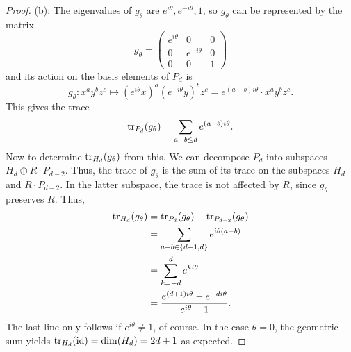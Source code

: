 \documentclass{amsart}
\begin{document}
\begin{proof}
		(b): The eigenvalues of $g_{\theta}$ are $e^{i\theta},e^{-i\theta},1$, so $g_{\theta}$ can be represented by the matrix
		$$
		g_{\theta} = \begin{pmatrix}
			e^{i\theta} & 0 & 0 \\
			0 & e^{-i\theta} & 0\\
			0 & 0 & 1
		\end{pmatrix}
		$$
		and its action on the basis elements of $P_d$ is
		$$
		g_{\theta}: x^ay^bz^c \mapsto (e^{i\theta}x)^a(e^{-i\theta}y)^bz^c = e^{(a-b)i\theta} \cdot x^ay^bz^c.
		$$
		This gives the trace
		$$
		\operatorname{tr}_{P_d}(g_{\theta}) = \sum_{a+b\leq d} e^{(a-b)i\theta}.
		$$
		Now to determine $\operatorname{tr}_{H_d}(g_{\theta})$ from this. We can decompose $P_d$ into subspaces $H_d\oplus R\cdot P_{d-2}$. Thus, the trace of $g_{\theta}$ is the sum of its trace on the subspaces $H_d$ and $R\cdot P_{d-2}$. In the latter subspace, the trace is not affected by $R$, since $g_{\theta}$ preserves $R$. Thus,
		\begin{align*}
		\operatorname{tr}_{H_d}(g_{\theta}) &= \operatorname{tr}_{P_d}(g_{\theta}) - \operatorname{tr}_{P_{d-2}}(g_{\theta}) \\
		&= \sum_{a+b \in \{d-1,d\}} e^{i\theta(a-b)}\\
		&= \sum_{k=-d}^{d} e^{ki\theta}\\
		&= \frac{e^{(d+1)i\theta} - e^{-di\theta}}{e^{i\theta} - 1}.
		\end{align*}
		The last line only follows if $e^{i\theta}\neq 1$, of course. In the case $\theta = 0$, the geometric sum yields $\operatorname{tr}_{H_d}(\operatorname{id})=\dim(H_d)=2d+1$ as expected.
		
	\end{proof}
	
\end{document}

